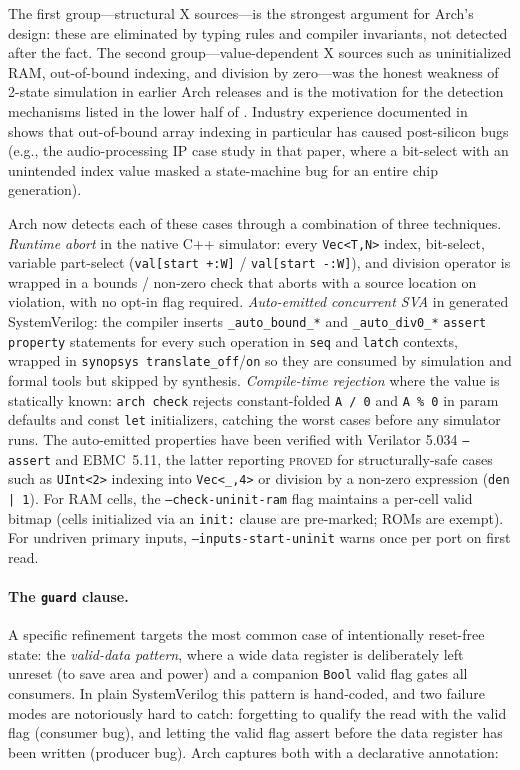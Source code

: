 \documentclass[11pt,twocolumn]{article}
\begin{document}
The first group---structural X sources---is the strongest argument for Arch's design: these are eliminated by typing rules and compiler invariants, not detected after the fact. The second group---value-dependent X sources such as uninitialized RAM, out-of-bound indexing, and division by zero---was the honest weakness of 2-state simulation in earlier Arch releases and is the motivation for the detection mechanisms listed in the lower half of . Industry experience documented in~\cite{zhao2014xoptimism} shows that out-of-bound array indexing in particular has caused post-silicon bugs (e.g., the audio-processing IP case study in that paper, where a bit-select with an unintended index value masked a state-machine bug for an entire chip generation).

Arch now detects each of these cases through a combination of three techniques. \emph{Runtime abort} in the native C++ simulator: every \texttt{Vec<T,N>} index, bit-select, variable part-select (\texttt{val[start +:W]} / \texttt{val[start -:W]}), and division operator is wrapped in a bounds / non-zero check that aborts with a source location on violation, with no opt-in flag required. \emph{Auto-emitted concurrent SVA} in generated SystemVerilog: the compiler inserts \texttt{\_auto\_bound\_*} and \texttt{\_auto\_div0\_*} \texttt{assert property} statements for every such operation in \texttt{seq} and \texttt{latch} contexts, wrapped in \texttt{synopsys translate\_off}/\texttt{on} so they are consumed by simulation and formal tools but skipped by synthesis. \emph{Compile-time rejection} where the value is statically known: \texttt{arch check} rejects constant-folded \texttt{A / 0} and \texttt{A \% 0} in param defaults and const \texttt{let} initializers, catching the worst cases before any simulator runs. The auto-emitted properties have been verified with Verilator 5.034 \texttt{--assert} and EBMC~5.11, the latter reporting \textsc{proved} for structurally-safe cases such as \texttt{UInt<2>} indexing into \texttt{Vec<\_,4>} or division by a non-zero expression (\texttt{den | 1}). For RAM cells, the \texttt{--check-uninit-ram} flag maintains a per-cell valid bitmap (cells initialized via an \texttt{init:} clause are pre-marked; ROMs are exempt). For undriven primary inputs, \texttt{--inputs-start-uninit} warns once per port on first read.

\paragraph{The \texttt{guard} clause.}
A specific refinement targets the most common case of intentionally reset-free state: the \emph{valid-data pattern}, where a wide data register is deliberately left unreset (to save area and power) and a companion \texttt{Bool} valid flag gates all consumers. In plain SystemVerilog this pattern is hand-coded, and two failure modes are notoriously hard to catch: forgetting to qualify the read with the valid flag (consumer bug), and letting the valid flag assert before the data register has been written (producer bug). Arch captures both with a declarative annotation:
\end{document}
